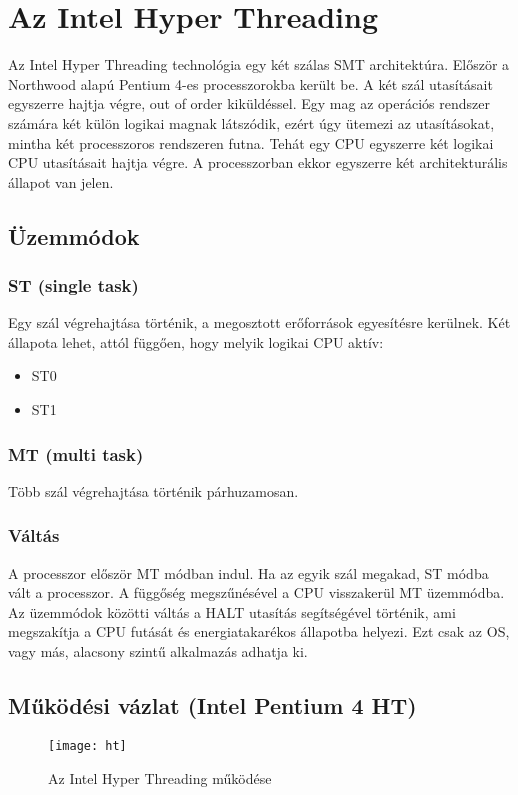 \section{Az Intel Hyper Threading}
Az Intel Hyper Threading technológia egy két szálas SMT architektúra.
Először a Northwood alapú Pentium 4-es processzorokba került be.
A két szál utasításait egyszerre hajtja végre, out of order kiküldéssel.
Egy mag az operációs rendszer számára két külön logikai magnak látszódik, ezért úgy ütemezi az utasításokat, mintha két processzoros rendszeren futna.
Tehát egy CPU egyszerre két logikai CPU utasításait hajtja végre.
A processzorban ekkor egyszerre két architekturális állapot van jelen.

\subsection{Üzemmódok}
\subsubsection{ST (single task)}
Egy szál végrehajtása történik, a megosztott erőforrások egyesítésre kerülnek.
Két állapota lehet, attól függően, hogy melyik logikai CPU aktív:
\begin{itemize}
    \item ST0
    \item ST1
\end{itemize}
\subsubsection{MT (multi task)}
Több szál végrehajtása történik párhuzamosan.
\subsubsection{Váltás}
A processzor először MT módban indul.
Ha az egyik szál megakad, ST módba vált a processzor.
A függőség megszűnésével a CPU visszakerül MT üzemmódba.
Az üzemmódok közötti váltás a HALT utasítás segítségével történik, ami megszakítja a CPU futását és energiatakarékos állapotba helyezi.
Ezt csak az OS, vagy más, alacsony szintű alkalmazás adhatja ki.

\subsection{Működési vázlat (Intel Pentium 4 HT)}
\begin{figure}[H]
    \texttt{[image: ht]}
    \centering
    \caption{Az Intel Hyper Threading működése}
    \label{fig:ht}
\end{figure}

